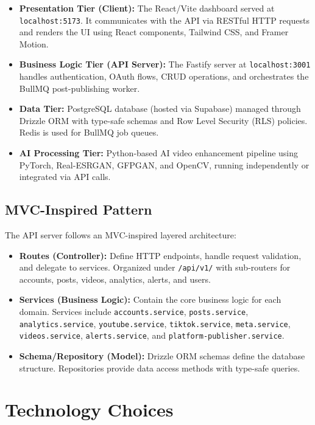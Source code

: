 \begin{itemize}
    \item \textbf{Presentation Tier (Client):} The React/Vite dashboard served at \texttt{localhost:5173}. It communicates with the API via RESTful HTTP requests and renders the UI using React components, Tailwind CSS, and Framer Motion.
    \item \textbf{Business Logic Tier (API Server):} The Fastify server at \texttt{localhost:3001} handles authentication, OAuth flows, CRUD operations, and orchestrates the BullMQ post-publishing worker.
    \item \textbf{Data Tier:} PostgreSQL database (hosted via Supabase) managed through Drizzle ORM with type-safe schemas and Row Level Security (RLS) policies. Redis is used for BullMQ job queues.
    \item \textbf{AI Processing Tier:} Python-based AI video enhancement pipeline using PyTorch, Real-ESRGAN, GFPGAN, and OpenCV, running independently or integrated via API calls.
\end{itemize}

\subsection{MVC-Inspired Pattern}

The API server follows an MVC-inspired layered architecture:

\begin{itemize}
    \item \textbf{Routes (Controller):} Define HTTP endpoints, handle request validation, and delegate to services. Organized under \texttt{/api/v1/} with sub-routers for accounts, posts, videos, analytics, alerts, and users.
    \item \textbf{Services (Business Logic):} Contain the core business logic for each domain. Services include \texttt{accounts.service}, \texttt{posts.service}, \texttt{analytics.service}, \texttt{youtube.service}, \texttt{tiktok.service}, \texttt{meta.service}, \texttt{videos.service}, \texttt{alerts.service}, and \texttt{platform-publisher.service}.
    \item \textbf{Schema/Repository (Model):} Drizzle ORM schemas define the database structure. Repositories provide data access methods with type-safe queries.
\end{itemize}

\section{Technology Choices}

